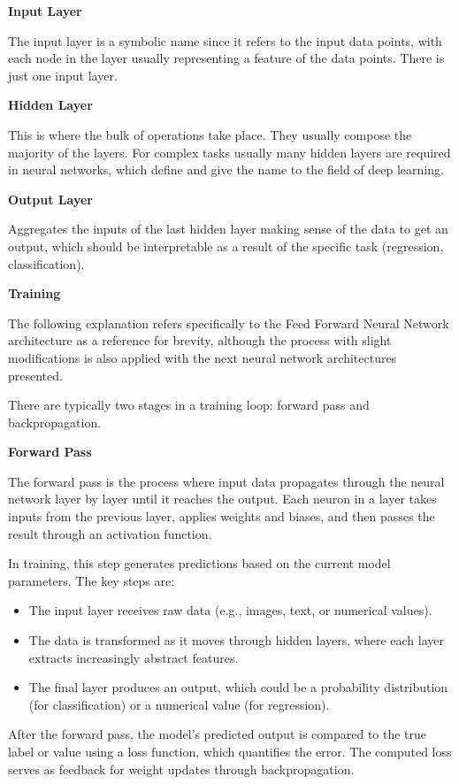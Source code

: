 \textbf{Input Layer}

The input layer is a symbolic name since it refers to the input data points, with each node in the layer usually representing a feature of the data points. There is just one input layer.

\textbf{Hidden Layer} 

This is where the bulk of operations take place. They usually compose the majority of the layers. For complex tasks usually many hidden layers are required in neural networks, which define and give the name to the field of deep learning.

\textbf{Output Layer}

Aggregates the inputs of the last hidden layer making sense of the data to get an output, which should be interpretable as a result of the specific task (regression, classification).


\textbf{Training}

The following explanation refers specifically to the Feed Forward Neural Network architecture as a reference for brevity, although the process with slight modifications is also applied with the next neural network architectures presented.

There are typically two stages in a training loop: forward pass and backpropagation.

\textbf{Forward Pass}

The forward pass is the process where input data propagates through the neural network layer by layer until it reaches the output. Each neuron in a layer takes inputs from the previous layer, applies weights and biases, and then passes the result through an activation function.  

In training, this step generates predictions based on the current model parameters. The key steps are:  
\begin{itemize}
    \item The input layer receives raw data (e.g., images, text, or numerical values).  
    \item The data is transformed as it moves through hidden layers, where each layer extracts increasingly abstract features.  
    \item The final layer produces an output, which could be a probability distribution (for classification) or a numerical value (for regression).  
\end{itemize}  

After the forward pass, the model's predicted output is compared to the true label or value using a loss function, which quantifies the error. The computed loss serves as feedback for weight updates through backpropagation.  

